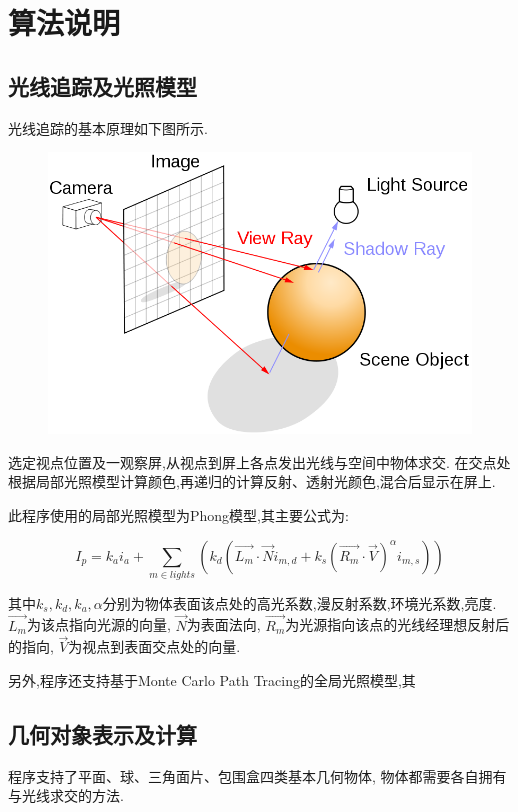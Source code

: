 \section{算法说明}
\subsection{光线追踪及光照模型}
光线追踪的基本原理如下图所示.
\begin{figure}[H]
  \centering
  \includegraphics[scale=0.4]{res/ray_tracing.png}
\end{figure}

选定视点位置及一观察屏,从视点到屏上各点发出光线与空间中物体求交.
在交点处根据局部光照模型计算颜色,再递归的计算反射、透射光颜色,混合后显示在屏上.

此程序使用的局部光照模型为Phong模型,其主要公式为\cite{phong}:

\[  I_p = k_ai_a + \sum_{m\in lights} (k_d ( \overrightarrow{L_m} \cdot \overrightarrow{N} i_{m, d} + k_s(\overrightarrow{R_m}\cdot
  \overrightarrow{V})^{\alpha} i_{m, s}))  \]

其中$ k_s, k_d, k_a, \alpha$分别为物体表面该点处的高光系数,漫反射系数,环境光系数,亮度.
$ \overrightarrow{L_m}$为该点指向光源的向量, $ \overrightarrow{N}$为表面法向,
$ \overrightarrow{R_m}$为光源指向该点的光线经理想反射后的指向,
$ \overrightarrow{V}$为视点到表面交点处的向量.

另外,程序还支持基于Monte Carlo Path Tracing的全局光照模型,其

\subsection{几何对象表示及计算}
程序支持了平面、球、三角面片、包围盒四类基本几何物体,
物体都需要各自拥有与光线求交的方法.

